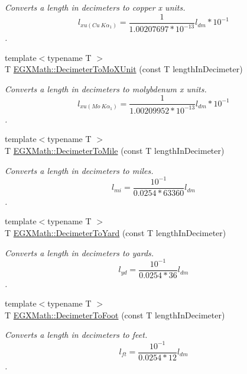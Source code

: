 \begin{DoxyCompactItemize}
\begin{DoxyCompactList}\small\item\em Converts a length in decimeters to copper x units. \[ l_{xu(Cu\ K\alpha_1)}= \frac{1}{1.00207697*10^{-13}} l_{dm} * 10^{-1}\]. \end{DoxyCompactList}\item 
{\footnotesize template$<$typename T $>$ }\\T \mbox{\hyperlink{group___e_g_x_math-_conversions-_length_conversions-_s_i-_decimeter-_non-_s_i_ga609f53e09c9a767639da3ad72905bb71}{E\+G\+X\+Math\+::\+Decimeter\+To\+Mo\+X\+Unit}} (const T length\+In\+Decimeter)
\begin{DoxyCompactList}\small\item\em Converts a length in decimeters to molybdenum x units. \[ l_{xu(Mo\ K\alpha_1)}=\frac{1}{1.00209952*10^{-13}} l_{dm} * 10^{-1}\]. \end{DoxyCompactList}\item 
{\footnotesize template$<$typename T $>$ }\\T \mbox{\hyperlink{group___e_g_x_math-_conversions-_length_conversions-_s_i-_decimeter-_imperial_gab7d9d207fb6aa53999300baf5d9cea16}{E\+G\+X\+Math\+::\+Decimeter\+To\+Mile}} (const T length\+In\+Decimeter)
\begin{DoxyCompactList}\small\item\em Converts a length in decimeters to miles. \[ l_{mi}=\frac{10^{-1}}{0.0254 * 63360} l_{dm} \]. \end{DoxyCompactList}\item 
{\footnotesize template$<$typename T $>$ }\\T \mbox{\hyperlink{group___e_g_x_math-_conversions-_length_conversions-_s_i-_decimeter-_imperial_ga2ffbd73da0cc3cbb36822127433e3267}{E\+G\+X\+Math\+::\+Decimeter\+To\+Yard}} (const T length\+In\+Decimeter)
\begin{DoxyCompactList}\small\item\em Converts a length in decimeters to yards. \[ l_{yd}= \frac{10^{-1}}{0.0254 * 36} l_{dm} \]. \end{DoxyCompactList}\item 
{\footnotesize template$<$typename T $>$ }\\T \mbox{\hyperlink{group___e_g_x_math-_conversions-_length_conversions-_s_i-_decimeter-_imperial_gaf86c80f8ce1e5ab6113a2a912c1f446e}{E\+G\+X\+Math\+::\+Decimeter\+To\+Foot}} (const T length\+In\+Decimeter)
\begin{DoxyCompactList}\small\item\em Converts a length in decimeters to feet. \[ l_{ft}= \frac{10^{-1}}{0.0254 * 12} l_{dm} \]. \end{DoxyCompactList}\item 

\end{DoxyCompactItemize}
